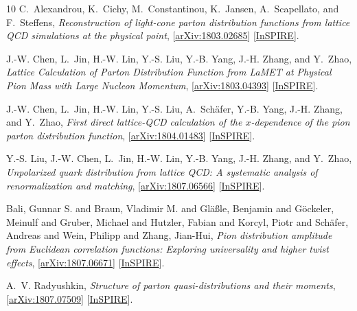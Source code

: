 \begin{thebibliography}{10}
C.~Alexandrou, K.~Cichy, M.~Constantinou, K.~Jansen, A.~Scapellato, and
  F.~Steffens,
{\it {Reconstruction of light-cone parton distribution functions from lattice
  QCD simulations at the physical point}},
  [\href{http://arxiv.org/abs/1803.02685}{{\ttfamily arXiv:1803.02685}}]
  [\href{http://inspirehep.net/record/1658890}{{\ttfamily InSPIRE}}].

J.-W. Chen, L.~Jin, H.-W. Lin, Y.-S. Liu, Y.-B. Yang, J.-H. Zhang, and Y.~Zhao,
{\it {Lattice Calculation of Parton Distribution Function from LaMET at
  Physical Pion Mass with Large Nucleon Momentum}},
  [\href{http://arxiv.org/abs/1803.04393}{{\ttfamily arXiv:1803.04393}}]
  [\href{http://inspirehep.net/record/1662058}{{\ttfamily InSPIRE}}].

J.-W. Chen, L.~Jin, H.-W. Lin, Y.-S. Liu, A.~Sch\"afer, Y.-B. Yang, J.-H.
  Zhang, and Y.~Zhao,
{\it {First direct lattice-QCD calculation of the $x$-dependence of the pion
  parton distribution function}},
  [\href{http://arxiv.org/abs/1804.01483}{{\ttfamily arXiv:1804.01483}}]
  [\href{http://inspirehep.net/record/1665821}{{\ttfamily InSPIRE}}].

Y.-S. Liu, J.-W. Chen, L.~Jin, H.-W. Lin, Y.-B. Yang, J.-H. Zhang, and Y.~Zhao,
{\it {Unpolarized quark distribution from lattice QCD: A systematic analysis of
  renormalization and matching}},
  [\href{http://arxiv.org/abs/1807.06566}{{\ttfamily arXiv:1807.06566}}]
  [\href{http://inspirehep.net/record/1682768}{{\ttfamily InSPIRE}}].

{Bali, Gunnar S. and Braun, Vladimir M. and Gl\"a{\ss}le, Benjamin and
  G\"ockeler, Meinulf and Gruber, Michael and Hutzler, Fabian and Korcyl, Piotr
  and Sch\"afer, Andreas and Wein, Philipp and Zhang, Jian-Hui},
{\it {Pion distribution amplitude from Euclidean correlation functions:
  Exploring universality and higher twist effects}},
  [\href{http://arxiv.org/abs/1807.06671}{{\ttfamily arXiv:1807.06671}}]
  [\href{http://inspirehep.net/record/1682987}{{\ttfamily InSPIRE}}].

A.~V. Radyushkin,
{\it {Structure of parton quasi-distributions and their moments}},
  [\href{http://arxiv.org/abs/1807.07509}{{\ttfamily arXiv:1807.07509}}]
  [\href{http://inspirehep.net/record/1683112}{{\ttfamily InSPIRE}}].


\end{thebibliography}
